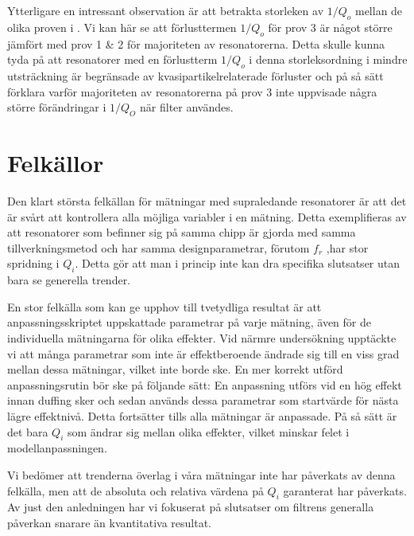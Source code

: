 \documentclass[main.tex]{subfiles}
\begin{document}
Ytterligare en intressant observation är att betrakta storleken av $1/Q_o$ mellan de olika proven i . Vi kan här se att förlusttermen $1/Q_o$ för prov 3 är något större jämfört med prov 1 \& 2 för majoriteten av resonatorerna. Detta skulle kunna tyda på att resonatorer med en förlustterm $1/Q_o$ i denna storleksordning i mindre utsträckning är begränsade av kvasipartikelrelaterade förluster och på så sätt förklara varför majoriteten av resonatorerna på prov 3 inte uppvisade några större förändringar i $1/Q_O$ när filter användes.








\section{Felkällor}
Den klart största felkällan för mätningar med supraledande resonatorer är att det är svårt att kontrollera alla möjliga variabler i en mätning. Detta exemplifieras av att resonatorer som befinner sig på samma chipp är gjorda med samma tillverkningsmetod och har samma designparametrar, förutom $f_r$ ,har stor spridning i $Q_i$. Detta gör att man i princip inte kan dra specifika slutsatser utan bara se generella trender.

En stor felkälla som kan ge upphov till tvetydliga resultat är att anpassningsskriptet uppskattade parametrar på varje mätning, även för de individuella mätningarna för olika effekter. Vid närmre undersökning upptäckte vi att många parametrar som inte är effektberoende ändrade sig till en viss grad mellan dessa mätningar, vilket inte borde ske. En mer korrekt utförd anpassningsrutin bör ske på följande sätt:
En anpassning utförs vid en hög effekt innan duffing sker och sedan används dessa parametrar som startvärde för nästa lägre effektnivå. Detta fortsätter tills alla mätningar är anpassade. På så sätt är det bara $Q_i$ som ändrar sig mellan olika effekter, vilket minskar felet i modellanpassningen.

Vi bedömer att trenderna överlag i våra mätningar inte har påverkats av denna felkälla, men att de absoluta och relativa värdena på $Q_i$ garanterat har påverkats. Av just den anledningen har vi fokuserat på slutsatser om filtrens generalla påverkan snarare än kvantitativa resultat. 
\end{document}
